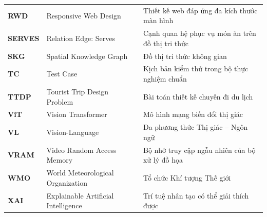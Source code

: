 \begin{longtable}{>{\bfseries}p{2.0cm} >{\raggedright\arraybackslash}p{6.8cm} >{\raggedright\arraybackslash}p{6.4cm}}
RWD & Responsive Web Design & Thiết kế web đáp ứng đa kích thước màn hình \\
SERVES & Relation Edge: Serves & Cạnh quan hệ phục vụ món ăn trên đồ thị tri thức \\
SKG & Spatial Knowledge Graph & Đồ thị tri thức không gian \\
TC & Test Case & Kịch bản kiểm thử trong bộ thực nghiệm chuẩn \\
TTDP & Tourist Trip Design Problem & Bài toán thiết kế chuyến đi du lịch \\
ViT & Vision Transformer & Mô hình mạng biến đổi thị giác \\
VL & Vision-Language & Đa phương thức Thị giác -- Ngôn ngữ \\
VRAM & Video Random Access Memory & Bộ nhớ truy cập ngẫu nhiên của bộ xử lý đồ họa \\
WMO & World Meteorological Organization & Tổ chức Khí tượng Thế giới \\
XAI & Explainable Artificial Intelligence & Trí tuệ nhân tạo có thể giải thích được \\
\end{longtable}
\endgroup
